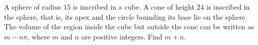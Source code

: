 A sphere of radius $15$ is inscribed in a cube. A cone of height $24$ is inscribed in the sphere, that is, its apex and the circle bounding its base lie on the sphere. The volume of the region inside the cube but outside the cone can be written as $m-n\pi$, where $m$ and $n$ are positive integers. Find $m+n$.
